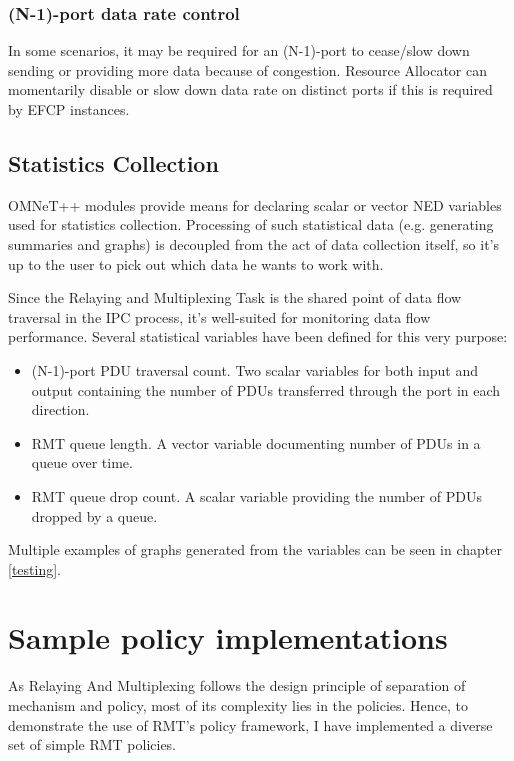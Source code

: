             \subsubsection{(N-1)-port data rate control}

                In some scenarios, it may be required for an (N-1)-port to cease/slow down sending or providing more data because of congestion. Resource Allocator can momentarily disable or slow down data rate on distinct ports if this is required by EFCP instances.


        \subsection{Statistics Collection}

            OMNeT++ modules provide means for declaring scalar or vector NED variables used for statistics collection. Processing of such statistical data (e.g. generating summaries and graphs) is decoupled from the act of data collection itself, so it's up to the user to pick out which data he wants to work with.

            Since the Relaying and Multiplexing Task is the shared point of data flow traversal in the IPC process, it's well-suited for monitoring data flow performance. Several statistical variables have been defined for this very purpose:

            \begin{itemize}
                \item (N-1)-port PDU traversal count. Two scalar variables for both input and output containing the number of PDUs transferred through the port in each direction.
                \item RMT queue length. A vector variable documenting number of PDUs in a queue over time.
                \item RMT queue drop count. A scalar variable providing the number of PDUs dropped by a queue.
            \end{itemize}

            Multiple examples of graphs generated from the variables can be seen in chapter \ref{testing}.

    \section{Sample policy implementations}

        As Relaying And Multiplexing follows the design principle of separation of mechanism and policy, most of its complexity lies in the policies. Hence, to demonstrate the use of RMT's policy framework, I have implemented a diverse set of simple RMT policies.

